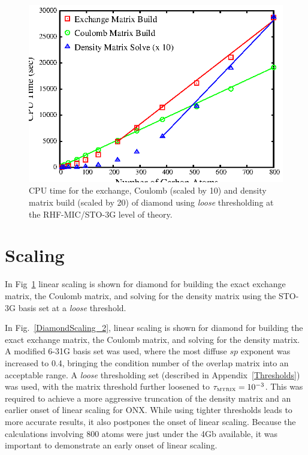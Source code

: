 \documentclass[prb,aps,nobibnotes,twocolumn,doublespace,twocolumngrid,superbib]{revtex4}
\begin{document}
\begin{figure}[h]
\caption{CPU time for the exchange, Coulomb (scaled by 10)  and density 
matrix build (scaled by 20) of diamond using {\it loose} thresholding 
at the RHF-MIC/STO-3G level of theory.}
\label{DiamondScaling_1}
{\centering \includegraphics{Timing_Diamond_ONX_1.ps} \par}
\end{figure}

\section{Scaling}\label{scaling}

In Fig~\ref{DiamondScaling_1}  linear scaling is shown for diamond for 
building the exact exchange matrix, the Coulomb matrix, and solving for the density matrix using the STO-3G 
basis set at a {\it loose} threshold.

In Fig.~\ref{DiamondScaling_2}, linear scaling is shown for diamond for 
building the exact exchange matrix, the Coulomb matrix, and solving for the density matrix. 
A modified 6-31G basis set was used, where the most diffuse $sp$ exponent was increased to 
0.4, bringing the condition number of the overlap matrix into an acceptable range.  A 
{\it loose} thresholding set (described in Appendix~\ref{Thresholds}) was used, with 
the matrix threshold further loosened to $\Huge \tau_{\rm \scriptscriptstyle MTRIX}=10^{-3}$.  
This was required to achieve a more aggressive truncation of the density matrix and an earlier 
onset of linear scaling for {\sc ONX}. While using tighter thresholds 
leads to more accurate results, it also postpones the onset of linear scaling. Because the 
calculations involving 800 atoms were just under the 4Gb available, it was important to 
demonstrate an early onset of linear scaling.  
\end{document}
